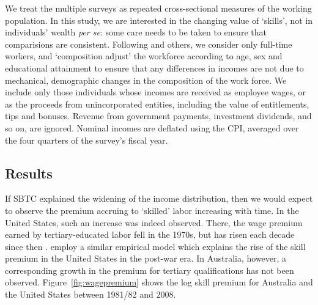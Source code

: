 We treat the multiple surveys as repeated cross-sectional measures of the working population. In this study, we are interested in the changing value of `skills', not in individuals' wealth {\em per se}: some care needs to be taken to ensure that comparisions are consistent. Following \citet{Acemoglu2011} and others, we consider only full-time workers, and `composition adjust' the workforce according to age, sex and educational attainment to ensure that any differences in incomes are not due to mechanical, demographic changes in the composition of the work force. We include only those individuals whose incomes are received as employee wages, or as the proceeds from unincorporated entities, including the value of entitlements, tips and bonuses. Revenue from government payments, investment dividends, and so on, are ignored. Nominal incomes are deflated using the CPI, averaged over the four quarters of the survey's fiscal year.

\subsection{Results}

If SBTC explained the widening of the income distribution, then we would expect to observe the premium accruing to `skilled' labor increasing with time. In the United States, such an increase was indeed observed. There, the wage premium earned by tertiary-educated labor fell in the 1970s, but has risen each decade since then \citep{Acemoglu2011}. \citet{Katz1992} employ a similar empirical model which explains the rise of the skill premium in the United States in the post-war era. In Australia, however, a corresponding growth in the premium for tertiary qualifications has not been observed. Figure~\ref{fig:wagepremium} shows the log skill premium for Australia and the United States between 1981/82 and 2008.

